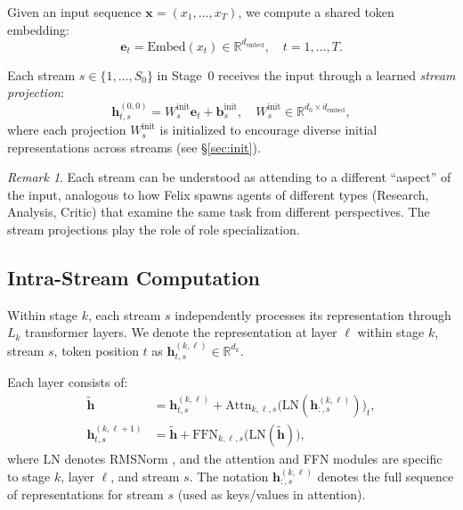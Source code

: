 \documentclass[11pt,a4paper]{article}
\theoremstyle{definition}
\theoremstyle{plain}
\theoremstyle{remark}
\newtheorem{remark}[definition]{Remark}
\newcommand{\R}{\mathbb{R}}
\begin{document}
Given an input sequence $\mathbf{x} = (x_1, \ldots, x_T)$, we compute a 
shared token embedding:
\begin{equation}
  \mathbf{e}_t = \text{Embed}(x_t) \in \R^{d_{\text{embed}}},
  \quad t = 1, \ldots, T.
\end{equation}

Each stream $s \in \{1, \ldots, S_0\}$ in Stage~0 receives the input 
through a learned \emph{stream projection}:
\begin{equation}\label{eq:stream-init}
  \mathbf{h}_{t,s}^{(0,0)} = W_s^{\text{init}} \mathbf{e}_t + 
  \mathbf{b}_s^{\text{init}}, 
  \quad W_s^{\text{init}} \in \R^{d_0 \times d_{\text{embed}}},
\end{equation}
where each projection $W_s^{\text{init}}$ is initialized to encourage 
diverse initial representations across streams (see \S\ref{sec:init}).

\begin{remark}
Each stream can be understood as attending to a different ``aspect'' of 
the input, analogous to how Felix spawns agents of different types 
(Research, Analysis, Critic) that examine the same task from different 
perspectives. The stream projections play the role of role specialization.
\end{remark}

\subsection{Intra-Stream Computation}\label{sec:intra-stream}

Within stage $k$, each stream $s$ independently processes its 
representation through $L_k$ transformer layers. We denote the 
representation at layer $\ell$ within stage $k$, stream $s$, token 
position $t$ as $\mathbf{h}_{t,s}^{(k,\ell)} \in \R^{d_k}$.

Each layer consists of:
\begin{align}
  \tilde{\mathbf{h}} &= \mathbf{h}_{t,s}^{(k,\ell)} + 
    \text{Attn}_{k,\ell,s}\bigl(
      \text{LN}(\mathbf{h}_{:,s}^{(k,\ell)})\bigr)_t, 
    \label{eq:attn-residual} \\
  \mathbf{h}_{t,s}^{(k,\ell+1)} &= \tilde{\mathbf{h}} + 
    \text{FFN}_{k,\ell,s}\bigl(\text{LN}(\tilde{\mathbf{h}})\bigr),
    \label{eq:ffn-residual}
\end{align}
where $\text{LN}$ denotes RMSNorm \cite{zhang2019root}, and the 
attention and FFN modules are specific to stage $k$, layer $\ell$, and 
stream $s$. The notation $\mathbf{h}_{:,s}^{(k,\ell)}$ denotes the full 
sequence of representations for stream $s$ (used as keys/values in 
attention).
\end{document}
